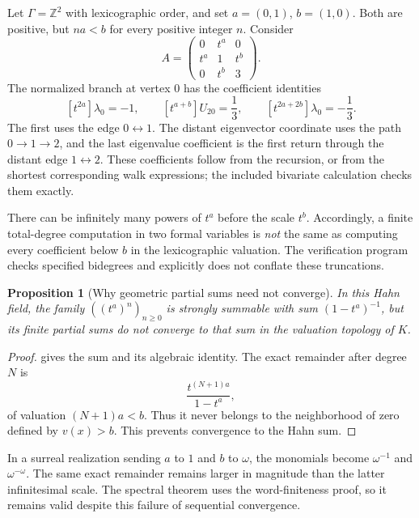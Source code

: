 \documentclass[11pt,a4paper]{article}
\numberwithin{equation}{section}
\newtheorem{proposition}[proposition]{Proposition}
\theoremstyle{definition}
\theoremstyle{remark}
\newcommand{\Z}{\mathbb Z}
\newcommand{\K}{K}
\newcommand{\coeff}[2]{[t^{#1}]#2}
\begin{document}
Let $\Gamma=\Z^2$ with lexicographic order, and set $a=(0,1)$, $b=(1,0)$.
Both are positive, but $na<b$ for every positive integer $n$. Consider
\begin{equation}\label{ihs:rf:eq:ranktwo}
 A=\begin{pmatrix}
 0&t^a&0\\
 t^a&1&t^b\\
 0&t^b&3
 \end{pmatrix}.
\end{equation}
The normalized branch at vertex $0$ has the coefficient identities
\begin{equation}\label{ihs:rf:eq:ranktwocoeffs}
 \coeff{2a}{\lambda_0}=-1,\qquad
 \coeff{a+b}{U_{20}}=\frac13,\qquad
 \coeff{2a+2b}{\lambda_0}=-\frac13.
\end{equation}
The first uses the edge $0\leftrightarrow1$. The distant eigenvector
coordinate uses the path $0\to1\to2$, and the last eigenvalue coefficient is
the first return through the distant edge $1\leftrightarrow2$. These
coefficients follow from the recursion, or from the shortest corresponding
walk expressions; the included bivariate calculation checks them exactly.

There can be infinitely many powers of $t^a$ before the scale $t^b$.
Accordingly, a finite total-degree computation in two formal variables is
\emph{not} the same as computing every coefficient below $b$ in the
lexicographic valuation. The verification program checks specified bidegrees
and explicitly does not conflate these truncations.

\begin{proposition}[Why geometric partial sums need not converge]\label{ihs:rf:prop:noconv}
In this Hahn field, the family $((t^a)^n)_{n\ge0}$ is strongly summable with
sum $(1-t^a)^{-1}$, but its finite partial sums do not converge to that sum
in the valuation topology of $\K$.
\end{proposition}
\begin{proof}
 gives the sum and its algebraic identity. The exact
remainder after degree $N$ is
\[
 \frac{t^{(N+1)a}}{1-t^a},
\]
of valuation $(N+1)a<b$. Thus it never belongs to the neighborhood of zero
defined by $v(x)>b$. This prevents convergence to the Hahn sum.
\end{proof}

In a surreal realization sending $a$ to $1$ and $b$ to $\omega$, the
monomials become $\omega^{-1}$ and $\omega^{-\omega}$. The same exact
remainder remains larger in magnitude than the latter infinitesimal scale.
The spectral theorem uses the word-finiteness proof, so it remains valid
despite this failure of sequential convergence.
\end{document}
